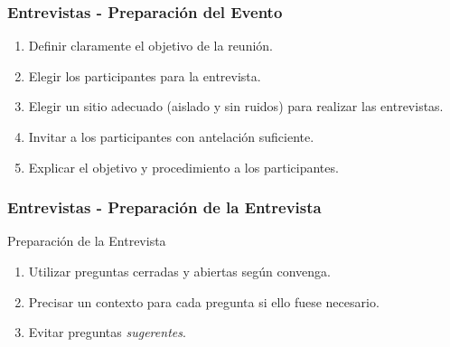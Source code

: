 ﻿\documentclass[handout,a4paper,slidestop,xcolor=pst,dvips,blue]{beamer}
\begin{document}
\begin{frame}[c]
    \frametitle{Entrevistas - Preparación del Evento}
    \begin{enumerate}[<+->]
        \item Definir claramente el objetivo de la reunión.
        \item Elegir los participantes para la entrevista.
        \item Elegir un sitio adecuado (aislado y sin ruidos) para realizar las entrevistas.
        \item Invitar a los participantes con antelación suficiente.
        \item Explicar el objetivo y procedimiento a los participantes.
    \end{enumerate}
\end{frame}

\begin{frame}[t]
    \frametitle{Entrevistas - Preparación de la Entrevista}
    \begin{block}{Preparación de la Entrevista}
    \begin{enumerate}[<+->]
        \item Utilizar preguntas cerradas y abiertas según convenga.
        \item Precisar un contexto para cada pregunta si ello fuese necesario.
        \item Evitar preguntas \emph{sugerentes}.
    \end{enumerate}
    \end{block}
\end{frame}
\end{document}
